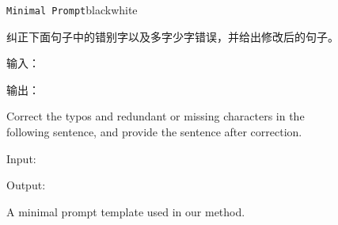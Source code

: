 \begin{figure}[tb!]
    \centering%
    \begin{promptbox}{\texttt{Minimal Prompt}}{black}{white}
        \footnotesize{
            纠正下面句子中的错别字以及多字少字错误，并给出修改后的句子。\return

            输入：\return

            输出：
        }
        \tcblower
        \footnotesize
        Correct the typos and redundant or missing characters in the following sentence, and provide the sentence after correction.\return

        \footnotesize
        Input: \return

        \footnotesize
        Output:

    \end{promptbox}
    \caption{
        A minimal prompt template used in our method.
    }
    \label{fig:minimal_prompt}
\end{figure}
